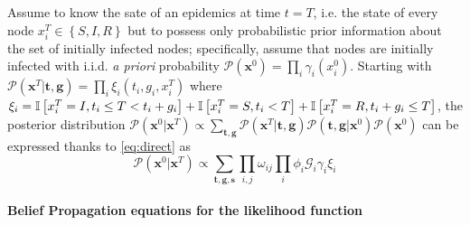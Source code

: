 Assume to know the sate of an epidemics at time $t=T$, i.e. the state
of every node $x_{i}^{T}\in\left\{ S,I,R\right\} $ but to possess
only probabilistic prior information about the set of initially infected
nodes; specifically, assume that nodes are initially infected with i.i.d. {\em a priori} probability $\mathcal{P}\left(\mathbf{x}^{0}\right)=\prod_{i}\gamma_{i}\left(x_{i}^{0}\right)$.
Starting with $\mathcal{P}\left(\mathbf{x}^{T}|\mathbf{t},\mathbf{g}\right)=\prod_{i}\xi_{i}\left(t_{i},g_{i},x_{i}^{T}\right)$
where $\mathcal{\xi}_{i}=\mathbb I\left[x_{i}^{T}=I,t_{i}\leq T<t_{i}+g_{i}\right]+\mathbb I\left[x_{i}^{T}=S,t_i < T\right]+\mathbb I\left[x_{i}^{T}=R,t_{i}+g_{i}\leq T\right]$,
the posterior distribution $\mathcal{P}\left(\mathbf{x}^{0}|\mathbf{x}^{T}\right)\propto\sum_{\mathbf{t,g}}\mathcal{P}\left(\mathbf{x}^{T}|\mathbf{t},\mathbf{g}\right)\mathcal{P}\left(\mathbf{t},\mathbf{g}|\mathbf{x}^{0}\right)\mathcal{P}\left(\mathbf{x}^{0}\right)$
can be expressed thanks to \eqref{eq:direct} as
\begin{equation}
\mathcal{P}\left(\mathbf{x}^{0}|\mathbf{x}^{T}\right)\propto\sum_{\mathbf{t},\mathbf{g},\mathbf{s}}\prod_{i,j}\omega_{ij}\prod_{i}\phi_{i}\mathcal{G}_{i}\gamma_{i}\xi_{i}\label{eq:Bayes}
\end{equation}



\paragraph*{Belief Propagation equations for the likelihood function}

